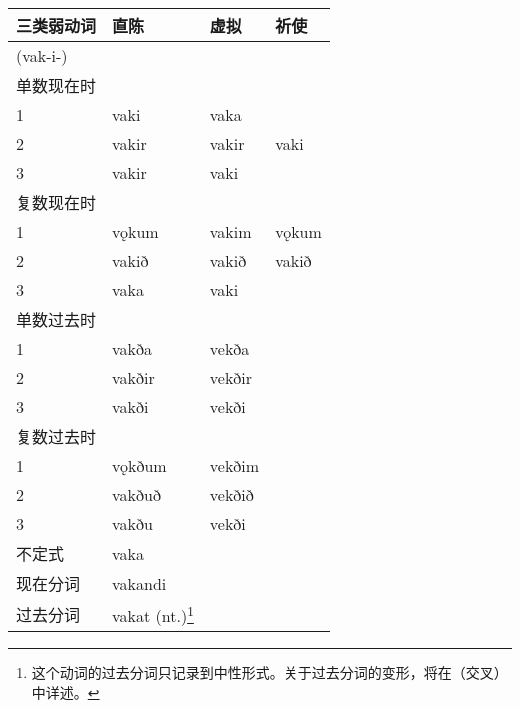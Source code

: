 \begin{longtable}{llll}
  \toprule
  三类弱动词    & 直陈                                                           & 虚拟     & 祈使    \\
  \midrule
  \endhead
  \bottomrule
  \endfoot
  (vak-i-) &                                                              &        &       \\
  单数现在时    &                                                              &        &       \\
  1        & vaki                                                         & vaka   &       \\
  2        & vakir                                                        & vakir  & vaki  \\
  3        & vakir                                                        & vaki   &       \\
  复数现在时    &                                                              &        &       \\
  1        & vǫkum                                                        & vakim  & vǫkum \\
  2        & vakið                                                        & vakið  & vakið \\
  3        & vaka                                                         & vaki   &       \\
  单数过去时    &                                                              &        &       \\
  1        & vakða                                                        & vekða  &       \\
  2        & vakðir                                                       & vekðir &       \\
  3        & vakði                                                        & vekði  &       \\
  复数过去时    &                                                              &        &       \\
  1        & vǫkðum                                                       & vekðim &       \\
  2        & vakðuð                                                       & vekðið &       \\
  3        & vakðu                                                        & vekði  &       \\
  不定式      & vaka                                                         &        &       \\
  现在分词     & vakandi                                                      &        &       \\
  过去分词     & vakat (nt.)\footnote{这个动词的过去分词只记录到中性形式。关于过去分词的变形，将在（交叉）中详述。}
           &                                                              &                \\
\end{longtable}

